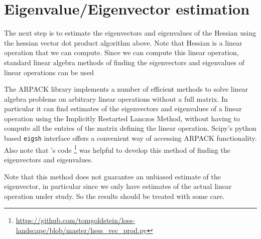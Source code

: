 \documentclass{article}
\theoremstyle{plain}
\theoremstyle{definition}
\theoremstyle{remark}
\begin{document}
	\section{Eigenvalue/Eigenvector estimation}
	
	The next step is to estimate the eigenvectors and eigenvalues of the Hessian using the hessian vector dot product algorithm above. Note that Hessian is a linear operation that we can compute. Since we can compute this linear operation, standard linear algebra methods of finding the eigenvectors and eigenvalues of linear operations can be used
		
	The ARPACK library\cite{arpack} implements a number of efficient methods to solve linear algebra problems on arbitrary linear operations without a full matrix. In particular it can find estimates of the eigenvectors and eigenvalues of a linear operation using the Implicitly Restarted Lanczos Method, without having to compute all the entries of the matrix defining the linear operation. Scipy's python based \texttt{eigsh} interface offers a convenient way of accessing ARPACK functionality. Also note that
	\cite{visualloss}'s code \footnote{\url{https://github.com/tomgoldstein/loss-landscape/blob/master/hess_vec_prod.py}} was helpful to develop this method of finding the eigenvectors and eigenvalues.
	
	Note that this method does not guarantee an unbiased estimate of the eigenvector, in particular since we only have estimates of the actual linear operation under study. So the results should be treated with some care.
	
\end{document}
